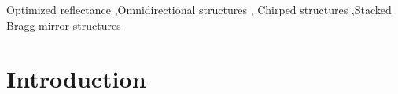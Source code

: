 \documentclass[a4paper,fleqn]{cas-sc}
\begin{document}

\begin{keywords}
  Optimized reflectance \sep Omnidirectional structures \sep
  Chirped structures \sep Stacked Bragg mirror structures
\end{keywords}

\maketitle

\section{Introduction}
\end{document}
